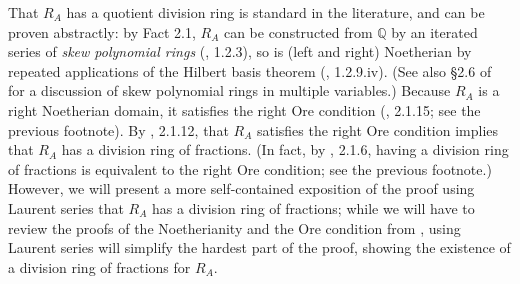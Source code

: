 \documentclass{amsart}
\theoremstyle{definition}
\theoremstyle{remark}
\numberwithin{equation}{section}
\begin{document}
That $R_{A}$ has a quotient division ring is standard in the literature, and can be proven abstractly: by Fact 2.1, $R_{A}$ can be constructed from $\mathbb{Q}$ by an iterated series of \textit{skew polynomial rings} (\cite{mcconnell1987noncommutative}, 1.2.3), so is (left and right) Noetherian by repeated applications of the Hilbert basis theorem (\cite{mcconnell1987noncommutative}, 1.2.9.iv). (See also §2.6 of \cite{mcconnell1987noncommutative} for a discussion of skew polynomial rings in multiple variables.) Because $R_{A}$ is a right Noetherian domain, it satisfies the right Ore condition (\cite{mcconnell1987noncommutative}, 2.1.15; see the previous footnote). By \cite{mcconnell1987noncommutative}, 2.1.12, that $R_{A}$ satisfies the right Ore condition implies that $R_{A}$ has a division ring of fractions. (In fact, by \cite{mcconnell1987noncommutative}, 2.1.6, having a division ring of fractions is equivalent to the right Ore condition; see the previous footnote.) However, we will present a more self-contained exposition of the proof using Laurent series that $R_{A}$ has a division ring of fractions; while we will have to review the proofs of the Noetherianity and the Ore condition from \cite{mcconnell1987noncommutative}, using Laurent series will simplify the hardest part of the proof, showing the existence of a division ring of fractions for $R_{A}$.
\end{document}
